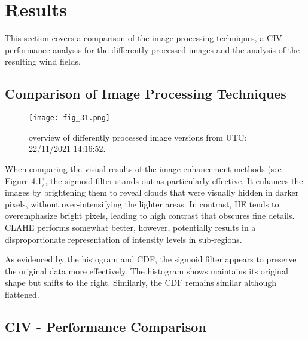 \chapter{Results\label{chap:results}}

This section covers a comparison of the image processing techniques, a CIV performance analysis for the differently processed images and the analysis of the resulting wind fields.

\section{Comparison of Image Processing Techniques}
\FloatBarrier
\begin{figure}[h!] 
    \centering
    \texttt{[image: fig\_31.png]}
    \caption{overview of differently processed image versions from UTC: 22/11/2021 14:16:52.}
\end{figure}
\FloatBarrier
When comparing the visual results of the image enhancement methods (see Figure 4.1), the sigmoid filter stands out as particularly effective. It enhances the images by brightening them to reveal clouds that were visually hidden in darker pixels, without over-intensifying the lighter areas. In contrast, HE tends to overemphasize bright pixels, leading to high contrast that obscures fine details. CLAHE performs somewhat better, however, potentially results in a disproportionate representation of intensity levels in sub-regions.

As evidenced by the histogram and CDF, the sigmoid filter appears to preserve the original data more effectively. The histogram shows maintains its original shape but shifts to the right. Similarly, the CDF remains similar although flattened.

\section{CIV - Performance Comparison}

